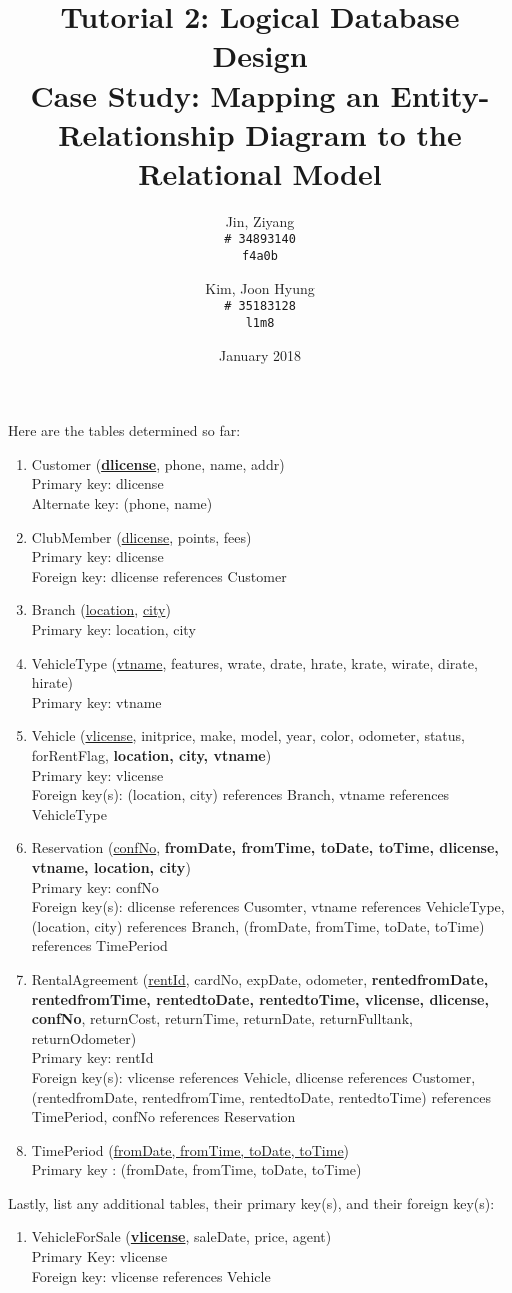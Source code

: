 \documentclass{article}
\title{%
	Tutorial 2: Logical Database Design \\
	\large Case Study: Mapping an Entity-Relationship Diagram to the Relational Model}
\author{
	Jin, Ziyang\\
	\texttt{\# 34893140}\\
	\texttt{f4a0b}
	\and
	Kim, Joon Hyung\\
	\texttt{\# 35183128}\\
	\texttt{l1m8}
}
\date{January 2018}
\begin{document}
	\maketitle
	Here are the tables determined so far:
	\begin{enumerate}
		\item Customer (\textbf{\underline{dlicense}}, phone, name, addr) \\ 
			Primary key: dlicense \\ 
			Alternate key: (phone, name)

		\item ClubMember (\underline{dlicense}, points, fees)\\
			Primary key: dlicense \\
			Foreign key: dlicense references Customer

		\item Branch (\underline{location}, \underline{city}) \\
			Primary key: location, city

		\item VehicleType (\underline{vtname}, features, wrate, drate, hrate, krate, wirate, dirate, hirate) \\
			Primary key: vtname

		\item Vehicle (\underline{vlicense}, initprice, make, model, year, color, odometer, status, forRentFlag, \textbf{location, city, vtname}) \\
			Primary key: vlicense \\
			Foreign key(s): (location, city) references Branch, vtname references VehicleType

		\item Reservation (\underline{confNo}, \textbf{fromDate, fromTime, toDate, toTime, dlicense, vtname, location, city})\\
			Primary key: confNo \\
			Foreign key(s): dlicense references Cusomter, vtname references VehicleType, (location, city) references Branch, (fromDate, fromTime, toDate, toTime) references TimePeriod

		\item RentalAgreement (\underline{rentId}, cardNo, expDate, odometer, \textbf{rentedfromDate, rentedfromTime, rentedtoDate, rentedtoTime, vlicense, dlicense, confNo}, returnCost, returnTime, returnDate, returnFulltank, returnOdometer) \\
			Primary key: rentId \\
			Foreign key(s): vlicense references Vehicle, dlicense references Customer, (rentedfromDate, rentedfromTime, rentedtoDate, rentedtoTime) references TimePeriod, confNo references Reservation

		\item TimePeriod (\underline{fromDate, fromTime, toDate, toTime}) \\
			Primary key : (fromDate, fromTime, toDate, toTime)

	\end{enumerate}
	Lastly, list any additional tables, their primary key(s), and their foreign key(s):
	\begin{enumerate}
		\item VehicleForSale (\textbf{\underline{vlicense}}, saleDate, price, agent) \\
			Primary Key: vlicense \\
			Foreign key: vlicense references Vehicle
	\end{enumerate}
	
\end{document}
